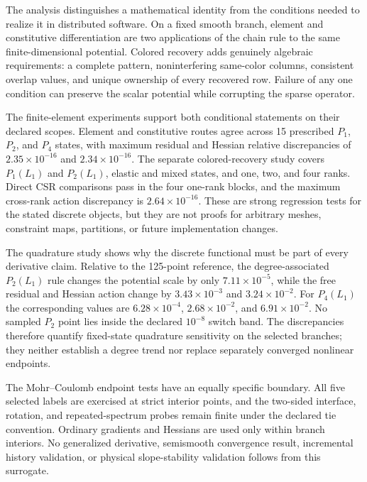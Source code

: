\label{sec:discussion}

The analysis distinguishes a mathematical identity from the conditions needed
to realize it in distributed software. On a fixed smooth branch, element and
constitutive differentiation are two applications of the chain rule to the
same finite-dimensional potential. Colored recovery adds genuinely algebraic
requirements: a complete pattern, noninterfering same-color columns, consistent
overlap values, and unique ownership of every recovered row. Failure of any one
condition can preserve the scalar potential while corrupting the sparse
operator.

The finite-element experiments support both conditional statements on their
declared scopes. Element and constitutive routes agree across 15 prescribed
$P_1$, $P_2$, and $P_4$ states, with maximum residual and Hessian relative
discrepancies of $2.35\times10^{-16}$ and $2.34\times10^{-16}$. The separate
colored-recovery study covers $P_1(L_1)$ and $P_2(L_1)$, elastic and mixed
states, and one, two, and four ranks. Direct CSR comparisons pass in the four
one-rank blocks, and the maximum cross-rank action discrepancy is
$2.64\times10^{-16}$. These are strong regression tests for the stated discrete
objects, but they are not proofs for arbitrary meshes, constraint maps,
partitions, or future implementation changes.

The quadrature study shows why the discrete functional must be part of every
derivative claim. Relative to the 125-point reference, the degree-associated
$P_2(L_1)$ rule changes the potential scale by only
$7.11\times10^{-5}$, while the free residual and Hessian action change by
$3.43\times10^{-3}$ and $3.24\times10^{-2}$. For $P_4(L_1)$ the corresponding
values are $6.28\times10^{-4}$, $2.68\times10^{-2}$, and
$6.91\times10^{-2}$. No sampled $P_2$ point lies inside the declared
$10^{-8}$ switch band. The discrepancies therefore quantify fixed-state
quadrature sensitivity on the selected branches; they neither establish a
degree trend nor replace separately converged nonlinear endpoints.

The Mohr--Coulomb endpoint tests have an equally specific boundary. All five
selected labels are exercised at strict interior points, and the two-sided
interface, rotation, and repeated-spectrum probes remain finite under the
declared tie convention. Ordinary gradients and Hessians are used only within
branch interiors. No generalized derivative, semismooth convergence result,
incremental history validation, or physical slope-stability validation follows
from this surrogate.

